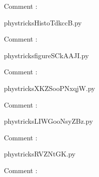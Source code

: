     Comment : 

    \clearpage
    


    \newcommand{\CaptionFigHistoTdkccB}{<+Type your caption here+>}
    \begin{center}
        
    \end{center}
    phystricksHistoTdkccB.py

    Comment : 

    \clearpage
    


    \newcommand{\CaptionFigfigureSCkAAJI}{<+Type your caption here+>}
    \begin{center}
        
    \end{center}
    phystricksfigureSCkAAJI.py

    Comment : 

    \clearpage
    


    \newcommand{\CaptionFigXKZSooPNxqjW}{<+Type your caption here+>}
    \begin{center}
        
    \end{center}
    phystricksXKZSooPNxqjW.py

    Comment : 

    \clearpage
    


    \newcommand{\CaptionFigLIWGooNsyZBz}{<+Type your caption here+>}
    \begin{center}
        
    \end{center}
    phystricksLIWGooNsyZBz.py

    Comment : 

    \clearpage
    


    \newcommand{\CaptionFigRVZNtGK}{<+Type your caption here+>}
    \begin{center}
        
    \end{center}
    phystricksRVZNtGK.py

    Comment : 

    \clearpage
    

